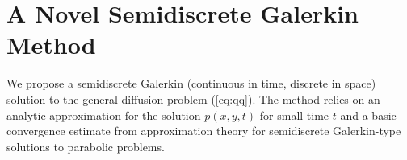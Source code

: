 \documentclass[10pt]{article}
\begin{document}

\section{A Novel Semidiscrete Galerkin
  Method} \label{sec:semidiscrete-galerkin} We propose a semidiscrete
Galerkin (continuous in time, discrete in space) solution to the
general diffusion problem (\ref{eq:qq}). The method relies on an
analytic approximation for the solution $p(x,y,t)$ for small time $t$
and a basic convergence estimate from approximation theory for
semidiscrete Galerkin-type solutions to parabolic problems.
\end{document}
